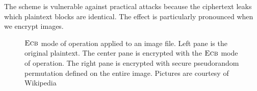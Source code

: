 \documentclass{crypto-exercise}
\newcommand{\ECB}{\textsc{Ecb}}
\begin{document}
\begin{solution}
The scheme is vulnerable against practical attacks because the ciphertext leaks which plaintext blocks are identical. The effect is particularly pronounced when we encrypt images.

\begin{figure}[!h]
\begin{center}
\end{center}
\caption{$\ECB$ mode of operation applied to an image file. Left pane is the original plaintext. The center pane is encrypted with the $\ECB$ mode of operation. The right pane is encrypted with secure pseudorandom  permutation defined on the entire image. Pictures are courtesy of Wikipedia}
\end{figure}
\end{solution}
\end{document}
